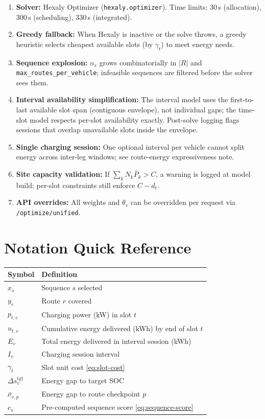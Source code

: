 \documentclass[11pt,a4paper]{article}
\newcommand{\1}{\mathbf{1}}
\begin{document}
\begin{enumerate}[label=\arabic*.]
  \item \textbf{Solver:} Hexaly Optimizer (\texttt{hexaly.optimizer}). Time limits:
        30\,s (allocation), 300\,s (scheduling), 330\,s (integrated).
  \item \textbf{Greedy fallback:} When Hexaly is inactive or the solve throws, a greedy
        heuristic selects cheapest available slots (by $\gamma_t$) to meet energy needs.
  \item \textbf{Sequence explosion:} $n_s$ grows combinatorially in $|R|$ and
        \texttt{max\_routes\_per\_vehicle}; infeasible sequences are filtered before
        the solver sees them.
  \item \textbf{Interval availability simplification:} The interval model uses the
        first-to-last available slot span (contiguous envelope), not individual gaps;
        the time-slot model respects per-slot availability exactly. Post-solve logging
        flags sessions that overlap unavailable slots inside the envelope.
  \item \textbf{Single charging session:} One optional interval per vehicle cannot
        split energy across inter-leg windows; see route-energy expressiveness note.
  \item \textbf{Site capacity validation:} If $\sum_k N_k \bar{P}_k > C$, a warning
        is logged at model build; per-slot constraints still enforce $C - d_t$.
  \item \textbf{API overrides:} All weights and $\theta_v$ can be overridden per request
        via \texttt{/optimize/unified}.
\end{enumerate}

\section{Notation Quick Reference}

\begin{center}
\begin{tabular}{@{}ll@{}}
\toprule
Symbol & Definition \\
\midrule
$x_s$ & Sequence $s$ selected \\
$y_r$ & Route $r$ covered \\
$p_{t,v}$ & Charging power (kW) in slot $t$ \\
$u_{t,v}$ & Cumulative energy delivered (kWh) by end of slot $t$ \\
$E_v$ & Total energy delivered in interval session (kWh) \\
$I_v$ & Charging session interval \\
$\gamma_t$ & Slot unit cost \eqref{eq:slot-cost} \\
$\Delta s_v^{\mathrm{tgt}}$ & Energy gap to target SOC \\
$\rho_{v,p}$ & Energy gap to route checkpoint $p$ \\
$c_s$ & Pre-computed sequence score \eqref{eq:sequence-score} \\
\bottomrule
\end{tabular}
\end{center}
\end{document}
